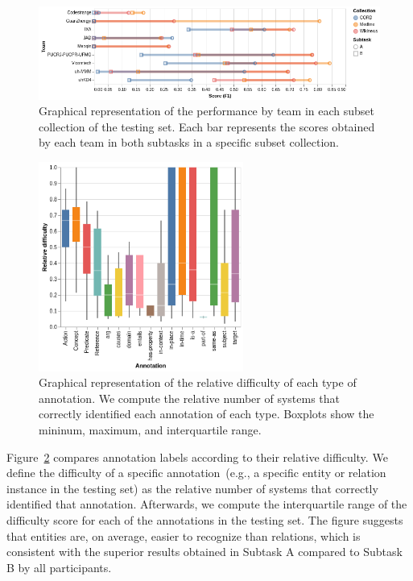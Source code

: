 \documentclass[a4paper,11pt,twocolumn,twoside]{article}
\begin{document}
\begin{figure}
  \includegraphics[width=\textwidth]{transfer.png}
  \caption{Graphical representation of the performance by team in each subset collection of the testing set. Each bar represents the scores obtained by each team in both subtasks in a specific subset collection.\label{fig:transfer}}
\end{figure}

\begin{figure}
  \centering
  \includegraphics[width=0.6\textwidth]{labels.png}
  \caption{Graphical representation of the relative difficulty of each type of annotation. We compute the relative number of systems that correctly identified each annotation of each type. Boxplots show the mininum, maximum, and interquartile range.\label{fig:labels}}
\end{figure}

Figure~\ref{fig:labels} compares annotation labels according to their relative difficulty. We define the difficulty of a specific annotation~(e.g., a specific entity or relation instance in the testing set) as the relative number of systems that correctly identified that annotation.
Afterwards, we compute the interquartile range of the difficulty score for each of the annotations in the testing set.
The figure suggests that entities are, on average, easier to recognize than relations, which is consistent with the superior results obtained in Subtask A compared to Subtask B by all participants.
\end{document}
